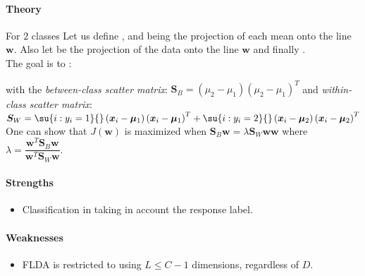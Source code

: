\paragraph{Theory}
For $2$ classes
Let us define 
,
and  being the projection of each mean onto the line
$\bm{w}$. Also let  be the projection of the data onto the 
line $\bm{w}$ and finally .\\
The goal is to :
\begin{center}
\end{center}
with the \emph{between-class scatter matrix}: $\bm{S}_{B} = \left(\mu_{2} - \mu_{1}
\right)\left(\mu_{2} - \mu_{1}\right)^{T}$ and \emph{within-class scatter matrix}:
$
\bm{S}_{W} =\su{i:y_{i}=1}{}\left(\bm{x}_{i} - \bm{\mu}_{1}\right) \left(\bm{x}_{i} - 
\bm{\mu}_{1}\right)^{T} + \su{i:y_{i}=2}{}\left(\bm{x}_{i} - \bm{\mu}_{2}\right)\left(
\bm{x}_{i} - \bm{\mu}_{2}\right)^{T}
$
One can show that $J(\bm{w})$ is maximized when $\bm{S}_{B}\bm{w} = \lambda\bm{S}_{W}\bm{w}\bm{w}$
where $\lambda = \dfrac{\bm{w}^{T}\bm{S}_{B}\bm{w}}{\bm{w}^{T}\bm{S}_{W}\bm{w}}$. 

\paragraph{Strengths}
\begin{itemize}
    \item Classification in taking in account the response label.
\end{itemize}

\paragraph{Weaknesses}
\begin{itemize}
    \item FLDA is restricted to using $L\leq C-1$ dimensions, regardless of $D$.
\end{itemize}

